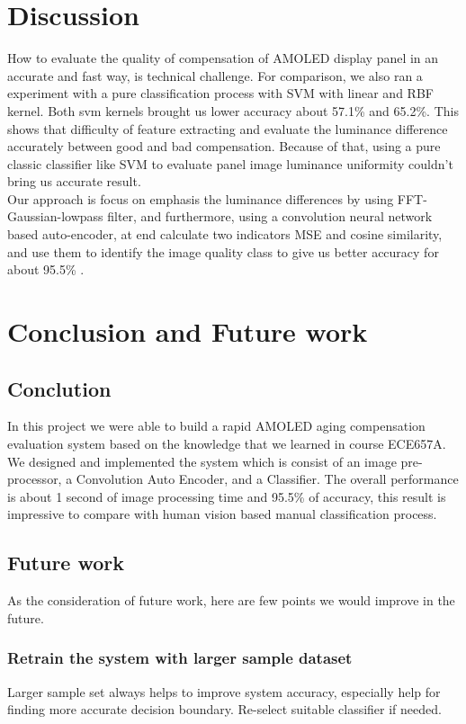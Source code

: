 \documentclass[runningheads]{llncs}
\begin{document}
\section{Discussion}
How to evaluate the quality of compensation of AMOLED display panel in an accurate and fast way, is technical challenge. For comparison, we also ran a experiment with a pure classification process with SVM with linear and RBF kernel. Both svm kernels brought us lower accuracy about 57.1\% and 65.2\%. This shows that difficulty of feature extracting and evaluate the luminance difference accurately between good and bad compensation. Because of that, using a pure classic classifier like SVM to evaluate panel image luminance uniformity couldn't bring us accurate result.\\
Our approach is focus on emphasis the luminance differences by using FFT-Gaussian-lowpass filter, and furthermore, using a convolution neural network based auto-encoder, at end calculate two indicators MSE and cosine similarity, and use them to identify the image quality class to give us better accuracy for about 95.5\% .
\section{Conclusion and Future work}
\subsection{Conclution}
In this project we were able to build a rapid AMOLED aging compensation evaluation system based on the knowledge that we learned in course ECE657A. We designed and implemented the system which is consist of an image pre-processor, a Convolution Auto Encoder, and a Classifier. The overall performance is about 1 second of image processing time and 95.5\% of accuracy, this result is impressive to compare with human vision based manual classification process.
\subsection{Future work}
As the consideration of future work, here are few points we would improve in the future.
\subsubsection{Retrain the system with larger sample dataset}
Larger sample set always helps to improve system accuracy, especially help for finding more accurate decision boundary. Re-select suitable classifier if needed.
\end{document}
